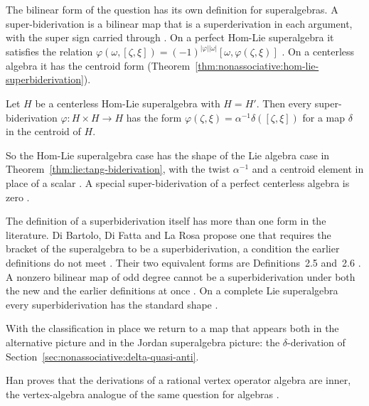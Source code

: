 The bilinear form of the question has its own definition for superalgebras. A
super-biderivation is a bilinear map that is a superderivation in each argument,
with the super sign carried through \cite[p.~2]{Pandey2024Superbiderivations}.
On a perfect Hom-Lie superalgebra it satisfies the relation
$\varphi(\omega,[\zeta,\xi])=(-1)^{|\varphi||\omega|}[\omega,\varphi(\zeta,\xi)]$
\cite[Lemma~3.7, p.~7]{Pandey2024Superbiderivations}. On a centerless algebra it
has the centroid form (Theorem~\ref{thm:nonassociative:hom-lie-superbiderivation}).

\begin{theorem}\label{thm:nonassociative:hom-lie-superbiderivation}
Let $H$ be a centerless Hom-Lie superalgebra with $H=H'$. Then every
super-biderivation $\varphi\colon H\times H\to H$ has the form
$\varphi(\zeta,\xi)=\alpha^{-1}\delta([\zeta,\xi])$ for a map $\delta$ in the
centroid of $H$.
\end{theorem}

So the Hom-Lie superalgebra case has the shape of the Lie algebra case in
Theorem~\ref{thm:lie:tang-biderivation}, with the twist $\alpha^{-1}$ and a
centroid element in place of a scalar
\cite[Theorem~3.8, p.~7]{Pandey2024Superbiderivations}. A special
super-biderivation of a perfect centerless algebra is zero
\cite[Theorem~3.10, p.~9]{Pandey2024Superbiderivations}.

The definition of a superbiderivation itself has more than one form in the
literature. Di Bartolo, Di Fatta and La Rosa propose one that requires the
bracket of the superalgebra to be a superbiderivation, a condition the earlier
definitions do not meet \cite[p.~2]{DiBartoloDiFattaLaRosa2025Super}. Their two
equivalent forms are Definitions~2.5 and~2.6
\cite[Definitions~2.5--2.6, p.~5]{DiBartoloDiFattaLaRosa2025Super}. A nonzero bilinear map of odd
degree cannot be a superbiderivation under both the new and the earlier
definitions at once \cite[p.~7]{DiBartoloDiFattaLaRosa2025Super}. On a complete
Lie superalgebra every superbiderivation has the standard shape
\cite[Theorem~3.6, p.~10]{DiBartoloDiFattaLaRosa2025Super}.

With the classification in place we return to a map that appears both in
the alternative picture and in the Jordan superalgebra picture: the
$\delta$-derivation of Section~\ref{sec:nonassociative:delta-quasi-anti}.

Han proves that the derivations of a rational vertex operator algebra are
inner, the vertex-algebra analogue of the same question for algebras
\cite[Abstract, p.~1]{Han2026VOA}.

